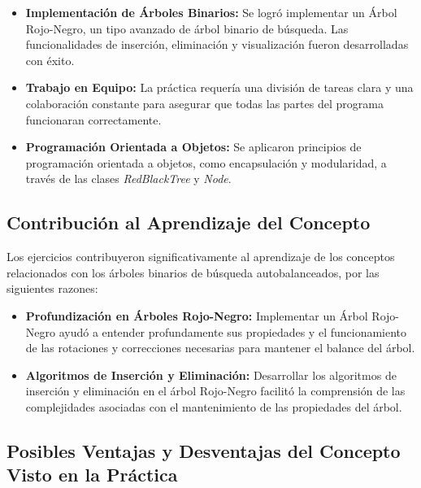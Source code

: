 \documentclass[12pt]{article}
\begin{document}
\begin{itemize}
    \item \textbf{Implementación de Árboles Binarios:} Se logró implementar un Árbol Rojo-Negro, un tipo avanzado de árbol binario de búsqueda. Las funcionalidades de inserción, eliminación y visualización fueron desarrolladas con éxito.
    \item \textbf{Trabajo en Equipo:} La práctica requería una división de tareas clara y una colaboración constante para asegurar que todas las partes del programa funcionaran correctamente.
    \item \textbf{Programación Orientada a Objetos:} Se aplicaron principios de programación orientada a objetos, como encapsulación y modularidad, a través de las clases \textit{RedBlackTree} y \textit{Node}.
\end{itemize}

\subsection*{Contribución al Aprendizaje del Concepto}

Los ejercicios contribuyeron significativamente al aprendizaje de los conceptos relacionados con los árboles binarios de búsqueda autobalanceados, por las siguientes razones:

\begin{itemize}
    \item \textbf{Profundización en Árboles Rojo-Negro:} Implementar un Árbol Rojo-Negro ayudó a entender profundamente sus propiedades y el funcionamiento de las rotaciones y correcciones necesarias para mantener el balance del árbol.
    \item \textbf{Algoritmos de Inserción y Eliminación:} Desarrollar los algoritmos de inserción y eliminación en el árbol Rojo-Negro facilitó la comprensión de las complejidades asociadas con el mantenimiento de las propiedades del árbol.
\end{itemize}

\subsection*{Posibles Ventajas y Desventajas del Concepto Visto en la Práctica}
\end{document}
